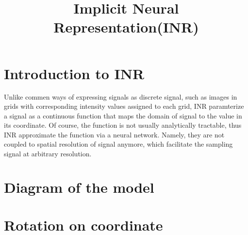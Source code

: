 \documentclass{article}
\title{Implicit Neural Representation(INR)}
\begin{document}
    \maketitle
    \section{Introduction to INR}
    Unlike commen ways of expressing signals as discrete signal, such as images in grids with corresponding intensity values assigned to each grid, INR paramterize a signal as a continuous function that maps the domain of signal to the value in its coordinate. Of course, the function is not usually analytically tractable, thus INR approximate the function via a neural network. Namely, they are not coupled to spatial resolution of signal anymore, which facilitate the sampling signal at arbitrary resolution.

    \section{Diagram of the model}
    \section{Rotation on coordinate}
\end{document}
